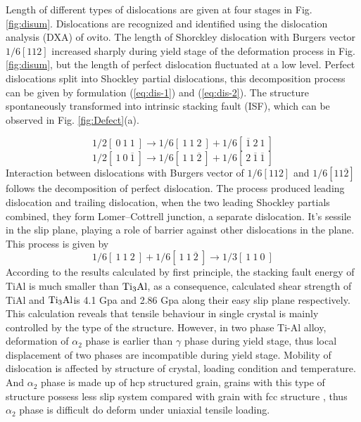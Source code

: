 \documentclass[Unknown,article,submit,moreauthors,pdftex,10pt,a4paper]{Definitions/mdpi}
\begin{document}
Length of different types of dislocations are given at four stages in Fig. \ref{fig:disum}. Dislocations are recognized and identified using the dislocation analysis (DXA) of ovito. The length of Shorckley dislocation with Burgers vector $1/6[1 1 2]$ increased sharply during yield stage of the deformation process in Fig. \ref{fig:disum}, but the length of perfect dislocation fluctuated at a low level. Perfect  dislocations split into Shockley partial dislocations, this decomposition process  can be given by formulation (\ref{eq:dis-1}) and (\ref{eq:dis-2}). The structure spontaneously transformed into intrinsic stacking fault (ISF), which can be observed in Fig. \ref{fig:Defect}(a). 


\begin{equation}\label{eq:dis-1}
1/2 [\ 0\ 1\ 1\ ] \to 1/6[\ 1\ 1\ 2\ ]+1/6[\ \overline{1}\ 2\ 1\ ]
\end{equation}
\begin{equation}\label{eq:dis-2}
1/2 [\ 1\ 0\ \overline{1}\ ] \to 1/6 [\ 1\ 1\ \overline{2}\ ] + 1/6[\ 2\ \overline{1}\ \overline{1}\ ]
\end{equation}
Interaction between dislocations with Burgers vector of $1/6 [112] $ and $ 1/6 [11\overline{2}]$ follows the decomposition of perfect dislocation. The process produced leading dislocation and trailing dislocation, when the two leading Shockley partials combined, they form Lomer–Cottrell junction, a separate dislocation. It's sessile in the slip plane, playing a role of barrier against other dislocations in the plane. This process is given by
\begin{equation}\label{eq:dis-3}
1/6 [\ 1\ 1\ 2\ ] + 1/6 [\ 1\ 1\  \overline{2}\ ] \to 1/3 [\ 1\ 1\ 0\ ]
\end{equation}
According to the  results calculated by first principle, the stacking fault energy of TiAl is much smaller than $\rm{Ti_3Al}$, as a consequence, calculated shear strength of TiAl and $\rm{Ti_3Al}$is 4.1 Gpa and 2.86 Gpa along their easy slip plane respectively\cite{Liu2007}. This calculation reveals that tensile behaviour in single crystal is mainly controlled by the type of the structure. However, in two phase Ti-Al alloy, deformation of $\alpha_2$ phase is earlier than $\gamma$ phase during yield stage, thus local displacement of two phases are incompatible during yield stage.  Mobility of dislocation is affected by structure of crystal, loading condition and temperature. And $\alpha_2$ phase is made up of hcp structured grain, grains with this type of structure possess less slip system compared with grain with fcc structure \cite{Zhu2012}, thus $\alpha_2$ phase is difficult do deform under uniaxial tensile loading. 
\end{document}

